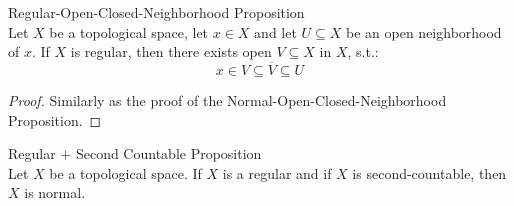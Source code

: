 \begin{proposition}{Regular-Open-Closed-Neighborhood Proposition}\\
Let $X$ be a topological space, let $x\in X$ and let $U \subseteq X$ be an open neighborhood of $x$. If $X$ is regular, then there exists open $V \subseteq X$ in $X$, s.t.:
$$x \in V \subseteq \overline{V} \subseteq U$$
\end{proposition}

\begin{proof}
    Similarly as the proof of the Normal-Open-Closed-Neighborhood Proposition.
\end{proof}

\begin{proposition}{Regular $+$ Second Countable Proposition}\\
Let $X$ be a topological space. If $X$ is a regular and if $X$ is second-countable, then $X$ is normal.
\end{proposition}

